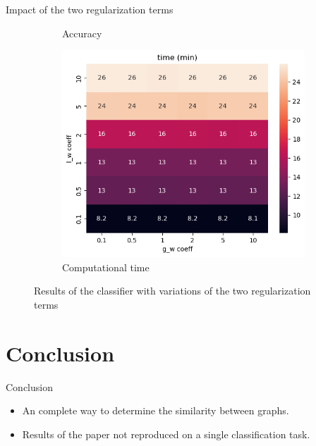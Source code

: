 \documentclass[french]{beamer}
\begin{document}
\begin{frame}{Impact of the two regularization terms}
\begin{figure}[h]
\begin{subfigure}{0.32\textwidth}
            \caption{Accuracy}
            \label{fig:accuracy}
        \end{subfigure}
        \begin{subfigure}{0.32\textwidth}
            \includegraphics[width=\textwidth]{figures/time_results.png}
            \caption{Computational time}
            \label{fig:time}
        \end{subfigure}
        \caption{Results of the classifier with variations of the two regularization terms}
    \end{figure}
    
\end{frame}
\section{Conclusion}
\begin{frame}{Conclusion}
\begin{itemize}
    \item An complete way to determine the similarity between graphs. 
    \item Results of the paper not reproduced on a single classification task. 
\end{itemize}
\end{frame}
\end{document}
